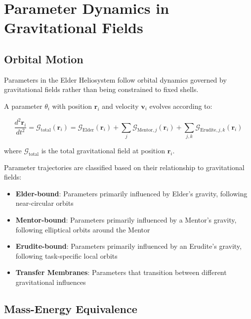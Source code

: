 \section{Parameter Dynamics in Gravitational Fields}

\subsection{Orbital Motion}

Parameters in the Elder Heliosystem follow orbital dynamics governed by gravitational fields rather than being constrained to fixed shells.

\begin{theorem}
A parameter $\theta_i$ with position $\mathbf{r}_i$ and velocity $\mathbf{v}_i$ evolves according to:

\begin{equation}
\frac{d^2\mathbf{r}_i}{dt^2} = \mathcal{G}_{\text{total}}(\mathbf{r}_i) = \mathcal{G}_{\text{Elder}}(\mathbf{r}_i) + \sum_{j} \mathcal{G}_{\text{Mentor},j}(\mathbf{r}_i) + \sum_{j,k} \mathcal{G}_{\text{Erudite},j,k}(\mathbf{r}_i)
\end{equation}

where $\mathcal{G}_{\text{total}}$ is the total gravitational field at position $\mathbf{r}_i$.
\end{theorem}

\begin{definition}
Parameter trajectories are classified based on their relationship to gravitational fields:
\begin{itemize}
    \item \textbf{Elder-bound}: Parameters primarily influenced by Elder's gravity, following near-circular orbits
    \item \textbf{Mentor-bound}: Parameters primarily influenced by a Mentor's gravity, following elliptical orbits around the Mentor
    \item \textbf{Erudite-bound}: Parameters primarily influenced by an Erudite's gravity, following task-specific local orbits
    \item \textbf{Transfer Membranes}: Parameters that transition between different gravitational influences
\end{itemize}
\end{definition}

\subsection{Mass-Energy Equivalence}

